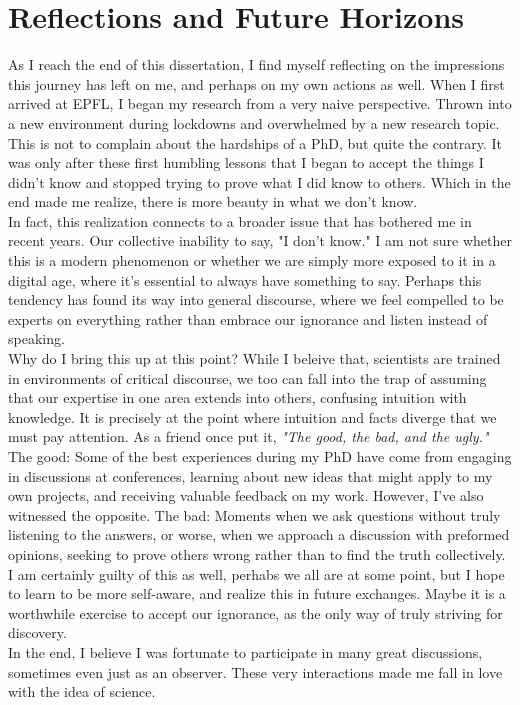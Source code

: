 \cleardoublepage
\chapter*{Reflections and Future Horizons}

As I reach the end of this dissertation, I find myself reflecting on the impressions this journey has left on me, and perhaps on my own actions as well.
When I first arrived at EPFL, I began my research from a very naive perspective.
Thrown into a new environment during lockdowns and overwhelmed by a new research topic.
This is not to complain about the hardships of a PhD, but quite the contrary.
It was only after these first humbling lessons that I began to accept the things I didn’t know and stopped trying to prove what I did know to others.
Which in the end made me realize, there is more beauty in what we don't know.\\
In fact, this realization connects to a broader issue that has bothered me in recent years.
Our collective inability to say, "I don't know."
I am not sure whether this is a modern phenomenon or whether we are simply more exposed to it in a digital age, where it's essential to always have something to say.
Perhaps this tendency has found its way into general discourse, where we feel compelled to be experts on everything rather than embrace our ignorance and listen instead of speaking.\\

Why do I bring this up at this point?
While I beleive that, scientists are trained in environments of critical discourse, we too can fall into the trap of assuming that our expertise in one area extends into others, confusing intuition with knowledge.
It is precisely at the point where intuition and facts diverge that we must pay attention.
As a friend once put it, \textit{"The good, the bad, and the ugly."}
The good: Some of the best experiences during my PhD have come from engaging in discussions at conferences, learning about new ideas that might apply to my own projects, and receiving valuable feedback on my work.
However, I’ve also witnessed the opposite.
The bad: Moments when we ask questions without truly listening to the answers, or worse, when we approach a discussion with preformed opinions, seeking to prove others wrong rather than to find the truth collectively.
I am certainly guilty of this as well, perhabs we all are at some point, but I hope to learn to be more self-aware, and realize this in future exchanges.
Maybe it is a worthwhile exercise to accept our ignorance, as the only way of truly striving for discovery.\\
In the end, I believe I was fortunate to participate in many great discussions, sometimes even just as an observer.
These very interactions made me fall in love with the idea of science.\hfill\break


